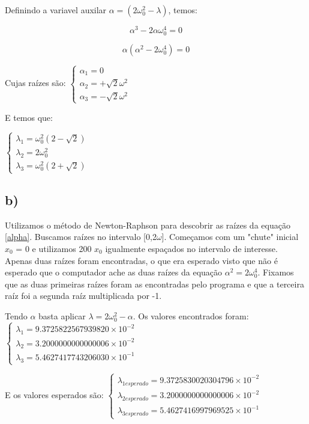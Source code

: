 \documentclass[a4wide]{report}
\begin{document}
Definindo a variavel auxilar $\alpha = (2 \omega_0^2 - \lambda)$, temos:

\begin{equation}
\alpha^3 - 2\alpha \omega_0^4  = 0
\end{equation}
\label{alpha}

\begin{equation*}
\alpha (\alpha^2 - 2\omega_0^4)  = 0
\end{equation*}

Cujas raízes são:
$\begin{cases} 
\alpha_1 =  0 \\  
\alpha_2 = + \sqrt{2}\omega^2  \\
\alpha_3 = - \sqrt{2}\omega^2
\end{cases} $

E temos que:

$\begin{cases} 
\lambda_1 =  \omega_0^2 (2-\sqrt{2}) \\  
\lambda_2 = 2\omega_0^2   \\
\lambda_3 =  \omega_0^2 (2+\sqrt{2})
\end{cases} $

\subsection*{b)}
Utilizamos o método de Newton-Raphson para descobrir as raízes da equação \ref{alpha}. Buscamos raízes no intervalo [0,2$\omega$]. Começamos com um "chute" inicial $x_0$ = 0 e utilizamos 200 $x_0$ igualmente espaçados no intervalo de interesse. Apenas duas raízes foram encontradas, o que era esperado visto que não é esperado que o computador ache as duas raízes da equação $\alpha^2 = 2\omega_0^4$. Fixamos que as duas primeiras raízes foram as encontradas pelo programa e que a terceira raíz foi a segunda raíz multiplicada por -1.

Tendo $\alpha$ basta aplicar $ \lambda = 2 \omega_0^2 - \alpha $. Os valores encontrados foram:
$\begin{cases} 
\lambda_1 =   9.3725822567939820\times10^{-2} \\  
\lambda_2 = 3.2000000000000006\times10^{-2}   \\
\lambda_3 =  5.4627417743206030\times10^{-1}
\end{cases} $

E os valores esperados são: 
$\begin{cases} 
\lambda_{1esperado} =   9.3725830020304796\times10^{-2} \\  
\lambda_{2esperado} = 3.2000000000000006\times10^{-2}   \\
\lambda_{3esperado} =  5.4627416997969525\times10^{-1}
\end{cases} $
        
\end{document}
